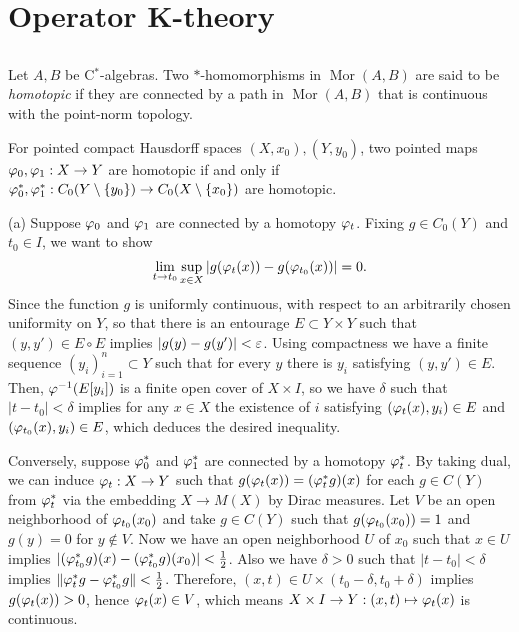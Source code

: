 \documentclass{../../large}
\DeclareMathOperator{\Mor}{Mor}
\begin{document}
\part{Operator K-theory}
\chapter{}

\begin{prb}
Let $A,B$ be C$^*$-algebras.
Two $*$-homomorphisms in $\Mor(A,B)$ are said to be \emph{homotopic} if they are connected by a path in $\Mor(A,B)$ that is continuous with the point-norm topology.
\begin{parts}
\item For pointed compact Hausdorff spaces $(X,x_0),(Y,y_0)$, two pointed maps $\varphi_0,\varphi_1:X\to Y$ are homotopic if and only if $\varphi_0^*,\varphi_1^*:C_0(Y\setminus\{y_0\})\to C_0(X\setminus\{x_0\})$ are homotopic.
\end{parts}
\end{prb}
\begin{pf}
(a)
Suppose $\varphi_0$ and $\varphi_1$ are connected by a homotopy $\varphi_t$.
Fixing $g\in C_0(Y)$ and $t_0\in I$, we want to show
\[\lim_{t\to t_0}\sup_{x\in X}|g(\varphi_t(x))-g(\varphi_{t_0}(x))|=0.\]
Since the function $g$ is uniformly continuous, with respect to an arbitrarily chosen uniformity on $Y$, so that there is an entourage $E\subset Y\times Y$ such that $(y,y')\in E\circ E$ implies $|g(y)-g(y')|<\varepsilon$.
Using compactness we have a finite sequence $(y_i)_{i=1}^n\subset Y$ such that for every $y$ there is $y_i$ satisfying $(y,y')\in E$.
Then, $\varphi^{-1}(E[y_i])$ is a finite open cover of $X\times I$, so we have $\delta$ such that $|t-t_0|<\delta$ implies for any $x\in X$ the existence of $i$ satisfying $(\varphi_t(x),y_i)\in E$ and $(\varphi_{t_0}(x),y_i)\in E$, which deduces the desired inequality.

Conversely, suppose $\varphi_0^*$ and $\varphi_1^*$ are connected by a homotopy $\varphi_t^*$.
By taking dual, we can induce $\varphi_t:X\to Y$ such that $g(\varphi_t(x))=(\varphi_t^*g)(x)$ for each $g\in C(Y)$ from $\varphi_t^*$ via the embedding $X\to M(X)$ by Dirac measures.
Let $V$ be an open neighborhood of $\varphi_{t_0}(x_0)$ and take $g\in C(Y)$ such that $g(\varphi_{t_0}(x_0))=1$ and $g(y)=0$ for $y\notin V$.
Now we have an open neighborhood $U$ of $x_0$ such that $x\in U$ implies $|(\varphi_{t_0}^*g)(x)-(\varphi_{t_0}^*g)(x_0)|<\frac12$.
Also we have $\delta>0$ such that $|t-t_0|<\delta$ implies $\|\varphi_t^*g-\varphi_{t_0}^*g\|<\frac12$.
Therefore, $(x,t)\in U\times(t_0-\delta,t_0+\delta)$ implies $g(\varphi_t(x))>0$, hence $\varphi_t(x)\in V$, which means $X\times I\to Y:(x,t)\mapsto\varphi_t(x)$ is continuous.
\end{pf}
\end{document}
